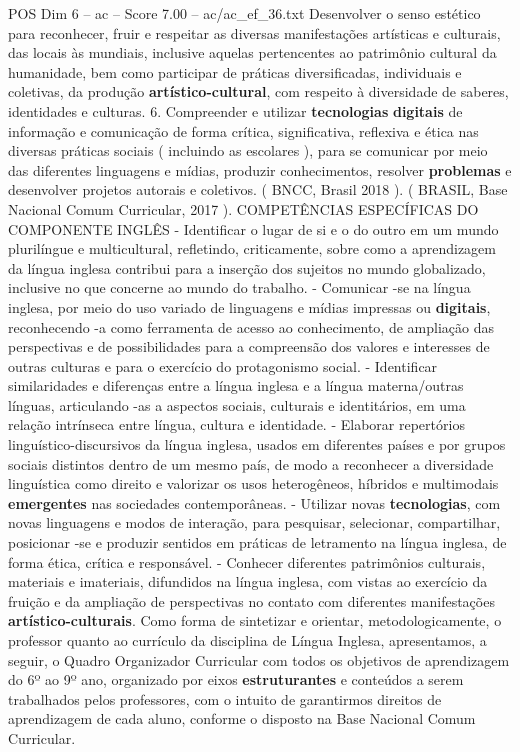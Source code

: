 \begin{textsample}{POS Dim 6 – ac – Score 7.00 – ac/ac\_ef\_36.txt}
Desenvolver o senso estético para reconhecer, fruir e respeitar as diversas manifestações artísticas e culturais, das locais às mundiais, inclusive aquelas pertencentes ao patrimônio cultural da humanidade, bem como participar de práticas diversificadas, individuais e coletivas, da produção \textbf{artístico-cultural}, com respeito à diversidade de saberes, identidades e culturas. 6.
Compreender e utilizar \textbf{tecnologias} \textbf{digitais} de informação e comunicação de forma crítica, significativa, reflexiva e ética nas diversas práticas sociais ( incluindo as escolares ), para se comunicar por meio das diferentes linguagens e mídias, produzir conhecimentos, resolver \textbf{problemas} e desenvolver projetos autorais e coletivos. ( BNCC, Brasil 2018 ). ( BRASIL, Base Nacional Comum Curricular, 2017 ).
COMPETÊNCIAS ESPECÍFICAS DO COMPONENTE INGLÊS - Identificar o lugar de si e o do outro em um mundo plurilíngue e multicultural, refletindo, criticamente, sobre como a aprendizagem da língua inglesa contribui para a inserção dos sujeitos no mundo globalizado, inclusive no que concerne ao mundo do trabalho. - Comunicar -se na língua inglesa, por meio do uso variado de linguagens e mídias impressas ou \textbf{digitais}, reconhecendo -a como ferramenta de acesso ao conhecimento, de ampliação das perspectivas e de possibilidades para a compreensão dos valores e interesses de outras culturas e para o exercício do protagonismo social. - Identificar similaridades e diferenças entre a língua inglesa e a língua materna/outras línguas, articulando -as a aspectos sociais, culturais e identitários, em uma relação intrínseca entre língua, cultura e identidade. - Elaborar repertórios linguístico-discursivos da língua inglesa, usados em diferentes países e por grupos sociais distintos dentro de um mesmo país, de modo a reconhecer a diversidade linguística como direito e valorizar os usos heterogêneos, híbridos e multimodais \textbf{emergentes} nas sociedades contemporâneas. - Utilizar novas \textbf{tecnologias}, com novas linguagens e modos de interação, para pesquisar, selecionar, compartilhar, posicionar -se e produzir sentidos em práticas de letramento na língua inglesa, de forma ética, crítica e responsável. - Conhecer diferentes patrimônios culturais, materiais e imateriais, difundidos na língua inglesa, com vistas ao exercício da fruição e da ampliação de perspectivas no contato com diferentes manifestações \textbf{artístico-culturais}.
Como forma de sintetizar e orientar, metodologicamente, o professor quanto ao currículo da disciplina de Língua Inglesa, apresentamos, a seguir, o Quadro Organizador Curricular com todos os objetivos de aprendizagem do 6º ao 9º ano, organizado por eixos \textbf{estruturantes} e conteúdos a serem trabalhados pelos professores, com o intuito de garantirmos direitos de aprendizagem de cada aluno, conforme o disposto na Base Nacional Comum Curricular.

\end{textsample}
